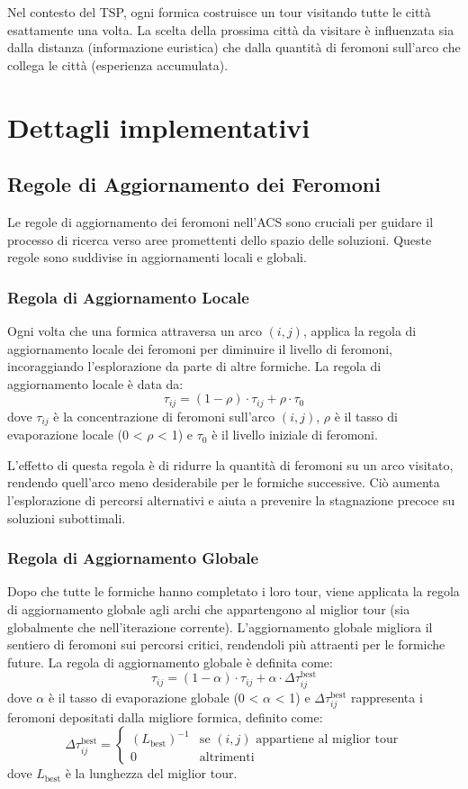 Nel contesto del \gls{TSP}, ogni formica costruisce un tour visitando tutte le città esattamente una volta. La scelta della prossima città da visitare è influenzata sia dalla distanza (informazione euristica) che dalla quantità di feromoni sull'arco che collega le città (esperienza accumulata).

\section{Dettagli implementativi}

\subsection{Regole di Aggiornamento dei Feromoni}

Le regole di aggiornamento dei feromoni nell'\gls{ACS} sono cruciali per guidare il processo di ricerca verso aree promettenti dello spazio delle soluzioni. Queste regole sono suddivise in aggiornamenti locali e globali.

\subsubsection{Regola di Aggiornamento Locale}
Ogni volta che una formica attraversa un arco $(i,j)$, applica la regola di aggiornamento locale dei feromoni per diminuire il livello di feromoni, incoraggiando l'esplorazione da parte di altre formiche. La regola di aggiornamento locale è data da:
\[
	\tau_{ij} = (1 - \rho) \cdot \tau_{ij} + \rho \cdot \tau_0
\]
dove $\tau_{ij}$ è la concentrazione di feromoni sull'arco $(i,j)$, $\rho$ è il tasso di evaporazione locale (0 < $\rho$ < 1) e $\tau_0$ è il livello iniziale di feromoni.

L'effetto di questa regola è di ridurre la quantità di feromoni su un arco visitato, rendendo quell'arco meno desiderabile per le formiche successive. Ciò aumenta l'esplorazione di percorsi alternativi e aiuta a prevenire la stagnazione precoce su soluzioni subottimali.

\subsubsection{Regola di Aggiornamento Globale}
Dopo che tutte le formiche hanno completato i loro tour, viene applicata la regola di aggiornamento globale agli archi che appartengono al miglior tour (sia globalmente che nell'iterazione corrente). L'aggiornamento globale migliora il sentiero di feromoni sui percorsi critici, rendendoli più attraenti per le formiche future. La regola di aggiornamento globale è definita come:
\[
	\tau_{ij} = (1 - \alpha) \cdot \tau_{ij} + \alpha \cdot \Delta \tau_{ij}^{\text{best}}
\]
dove $\alpha$ è il tasso di evaporazione globale (0 < $\alpha$ < 1) e $\Delta \tau_{ij}^{\text{best}}$ rappresenta i feromoni depositati dalla migliore formica, definito come:
\[
	\Delta \tau_{ij}^{\text{best}} = \begin{cases}
		(L_{\text{best}})^{-1} & \text{se }(i,j)\text{ appartiene al miglior tour} \\
		0                      & \text{altrimenti}
	\end{cases}
\]
dove $L_{\text{best}}$ è la lunghezza del miglior tour.


